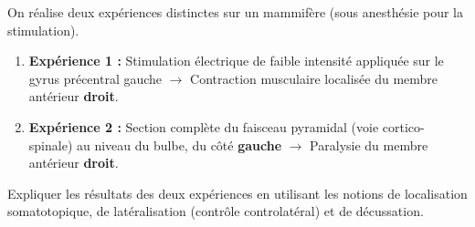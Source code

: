 \documentclass[11pt]{article}
\begin{document}
\begin{exercice}
On réalise deux expériences distinctes sur un mammifère (sous anesthésie pour la stimulation).
\begin{enumerate}
    \item \textbf{Expérience 1 :} Stimulation électrique de faible intensité appliquée sur le gyrus précentral gauche $\rightarrow$ Contraction musculaire localisée du membre antérieur \textbf{droit}.
    \item \textbf{Expérience 2 :} Section complète du faisceau pyramidal (voie cortico-spinale) au niveau du bulbe, du côté \textbf{gauche} $\rightarrow$ Paralysie du membre antérieur \textbf{droit}.
\end{enumerate}
Expliquer les résultats des deux expériences en utilisant les notions de localisation somatotopique, de latéralisation (contrôle controlatéral) et de décussation.
\end{exercice}
\end{document}
